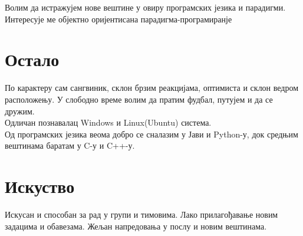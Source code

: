 \documentclass[letterpaper]{twentysecondcv}
\begin{document}
\large Волим да истражујем нове вештине у овиру програмских језика и парадигми. \\Интересује ме објектно оријентисана парадигма-програмиранје


\section{Остало}

\large По карактеру сам сангвиник, склон брзим реакцијама, оптимиста и склон ведром расположењу. У слободно време волим да пратим фудбал, путујем и да се дружим. 
\\Одличан познавалац Windows и Linux(Ubuntu) система.
\\Од програмских језика веома добро се сналазим у Јави и Python-у, док средњим вештинама баратам у C-у и C++-у.


\section{Искуство}

\large Искусан и способан за рад у групи и тимовима. Лако прилагођавање новим задацима и обавезама. Жељан напредовања у послу и новим вештинама.
\end{document}
